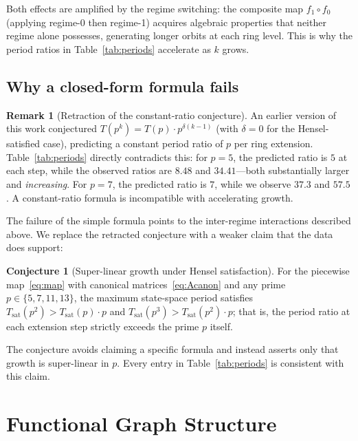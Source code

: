 \documentclass[11pt]{article}
\theoremstyle{plain}
\theoremstyle{definition}
\newtheorem{conjecture}[theorem]{Conjecture}
\newtheorem{remark}[theorem]{Remark}
\begin{document}
Both effects are amplified by the regime switching: the composite map $f_1 \circ f_0$ (applying regime-0 then regime-1) acquires algebraic properties that neither regime alone possesses, generating longer orbits at each ring level. This is why the period ratios in Table~\ref{tab:periods} accelerate as $k$ grows.

\subsection{Why a closed-form formula fails}

\begin{remark}[Retraction of the constant-ratio conjecture]
An earlier version of this work conjectured $T(p^k) = T(p) \cdot p^{\delta(k-1)}$ (with $\delta = 0$ for the Hensel-satisfied case), predicting a constant period ratio of $p$ per ring extension. Table~\ref{tab:periods} directly contradicts this: for $p=5$, the predicted ratio is $5$ at each step, while the observed ratios are $8.48$ and $34.41$---both substantially larger and \emph{increasing}. For $p=7$, the predicted ratio is $7$, while we observe $37.3$ and $57.5$. A constant-ratio formula is incompatible with accelerating growth.
\end{remark}

The failure of the simple formula points to the inter-regime interactions described above. We replace the retracted conjecture with a weaker claim that the data does support:

\begin{conjecture}[Super-linear growth under Hensel satisfaction]
\label{conj:superlinear}
For the piecewise map~\eqref{eq:map} with canonical matrices~\eqref{eq:Acanon} and any prime $p \in \{5, 7, 11, 13\}$, the maximum state-space period satisfies $T_{\mathrm{sat}}(p^2) > T_{\mathrm{sat}}(p) \cdot p$ and $T_{\mathrm{sat}}(p^3) > T_{\mathrm{sat}}(p^2) \cdot p$; that is, the period ratio at each extension step strictly exceeds the prime $p$ itself.
\end{conjecture}

\noindent The conjecture avoids claiming a specific formula and instead asserts only that growth is super-linear in $p$. Every entry in Table~\ref{tab:periods} is consistent with this claim.

\section{Functional Graph Structure}
\label{sec:fgraph}
\end{document}
